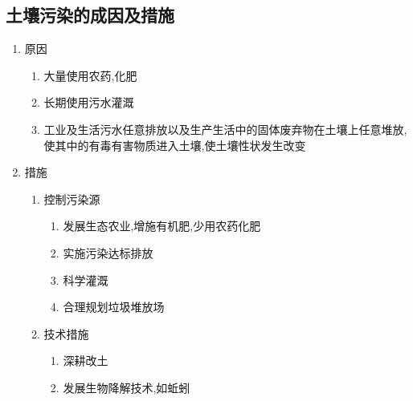 \documentclass[a4paper]{article}
\begin{document}
    \subsection{土壤污染的成因及措施}
    \begin{enumerate}
        \item 原因
        \begin{enumerate}
            \item 大量使用农药,化肥
            \item 长期使用污水灌溉
            \item 工业及生活污水任意排放以及生产生活中的固体废弃物在土壤上任意堆放,使其中的有毒有害物质进入土壤,使土壤性状发生改变
        \end{enumerate}
        \item 措施
        \begin{enumerate}
            \item 控制污染源
            \begin{enumerate}
                \item 发展生态农业,增施有机肥,少用农药化肥
                \item 实施污染达标排放
                \item 科学灌溉
                \item 合理规划垃圾堆放场
            \end{enumerate}
            \item 技术措施
            \begin{enumerate}
                \item 深耕改土
                \item 发展生物降解技术,如蚯蚓
            \end{enumerate}
        \end{enumerate}
    \end{enumerate}
\end{document}
